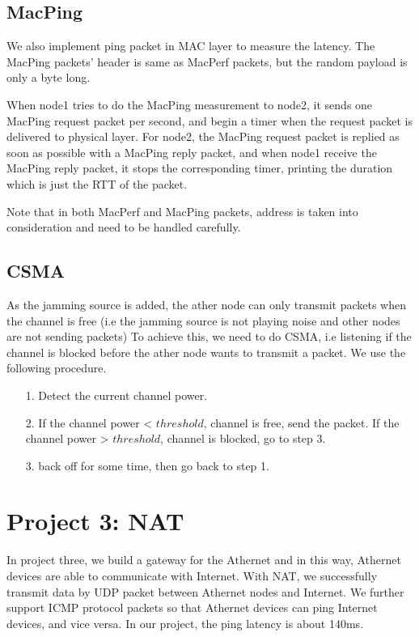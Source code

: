 \documentclass[11pt, conference]{IEEEtran}
\begin{document}
\subsection{MacPing}

We also implement ping packet in MAC layer to measure the latency. The MacPing packets' header is same as MacPerf packets, but the random payload is only a byte long.

When node1 tries to do the MacPing measurement to node2, it sends one MacPing request packet per second, and begin a timer when the request packet is delivered to physical layer. For node2, the MacPing request packet is replied
as soon as possible with a MacPing reply packet, and when node1 receive the MacPing reply packet, it stops the corresponding timer, printing the duration which is just the RTT of the packet.

Note that in both MacPerf and MacPing packets, address is taken into consideration and need to be handled carefully.

\subsection{{CSMA}}
As the jamming source is added, the ather node can only transmit packets when the channel is free (i.e the jamming source is not playing noise and other nodes are not sending packets)
To achieve this, we need to do CSMA, i.e listening if the channel is blocked before the ather node wants to transmit a packet. We use the following procedure.
\begin{itemize}
    \item[1.] Detect the current channel power.
    \item[2.] If the channel power < $threshold$, channel is free, send the packet. If the channel power > $threshold$, channel is blocked, go to step 3. 
    \item[3.] back off for some time, then go back to step 1.
\end{itemize}

\section{Project 3: NAT}

In project three, we build a gateway for the Athernet and in this way, Athernet devices are able to communicate with Internet. With NAT, we successfully transmit data by UDP packet between Athernet nodes and Internet. 
We further support ICMP protocol packets so that Athernet devices can ping Internet devices, and vice versa. In our project, the ping latency is about 140ms.
\end{document}
